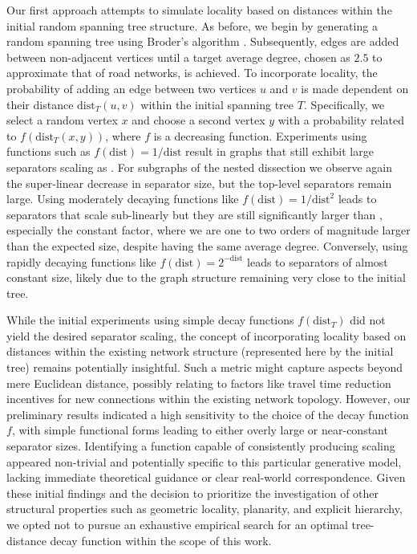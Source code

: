 Our first approach attempts to simulate locality based on distances within the initial random spanning tree structure.
As before, we begin by generating a random spanning tree using Broder's algorithm \cite{broder_generating_1989}.
Subsequently, edges are added between non-adjacent vertices until a target average degree, chosen as \(2.5\) to approximate that of road networks, is achieved.
To incorporate locality, the probability of adding an edge between two vertices \(u\) and \(v\) is made dependent on their distance \( \text{dist}_T(u, v) \) within the initial spanning tree \(T\).
Specifically, we select a random vertex \(x\) and choose a second vertex \(y\) with a probability related to \(f(\text{dist}_T(x, y))\), where \(f\) is a decreasing function.
Experiments using functions such as \( f(\text{dist}) = 1/\text{dist} \) result in graphs that still exhibit large separators scaling as .
For subgraphs of the nested dissection we observe again the super-linear decrease in separator size, but the top-level separators remain large.
Using moderately decaying functions like \( f(\text{dist}) = 1/\text{dist}^2 \) leads to separators that scale sub-linearly but they are still significantly larger than , especially the constant factor, where we are one to two orders of magnitude larger than the expected size, despite having the same average degree.
Conversely, using rapidly decaying functions like \( f(\text{dist}) = 2^{-\text{dist}} \) leads to separators of almost constant size, likely due to the graph structure remaining very close to the initial tree.

While the initial experiments using simple decay functions \(f(\text{dist}_T)\) did not yield the desired separator scaling, the concept of incorporating locality based on distances within the existing network structure (represented here by the initial tree) remains potentially insightful.
Such a metric might capture aspects beyond mere Euclidean distance, possibly relating to factors like travel time reduction incentives for new connections within the existing network topology.
However, our preliminary results indicated a high sensitivity to the choice of the decay function \(f\), with simple functional forms leading to either overly large or near-constant separator sizes.
Identifying a function capable of consistently producing  scaling appeared non-trivial and potentially specific to this particular generative model, lacking immediate theoretical guidance or clear real-world correspondence.
Given these initial findings and the decision to prioritize the investigation of other structural properties such as geometric locality, planarity, and explicit hierarchy, we opted not to pursue an exhaustive empirical search for an optimal tree-distance decay function within the scope of this work.

